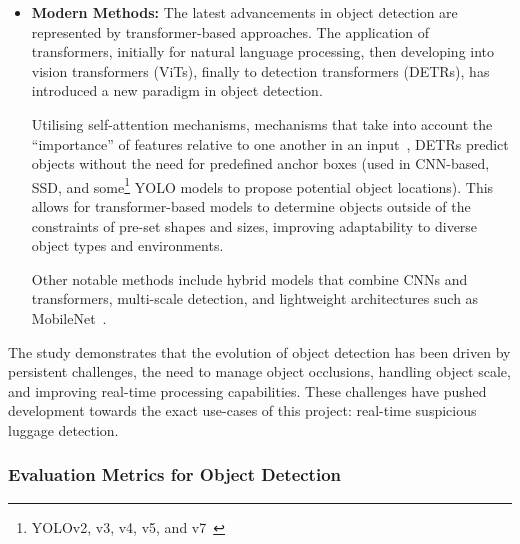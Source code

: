 \begin{itemize}
	      The shortcomings of two-stage detectors led to the development of single-stage
	      detectors. SSDs and YOLO (You Only Look Once)
	      \citep{jocher2023yolo8,pathak2023object} revolutionised the field by removing
	      the region proposal step, enabling predictions from an entire image in a single
	      propagation. This marked a breakthrough in real-time object detection, and is
	      used in nearly every example of abandoned luggage detection in literature
	      \citep{abandoned2025vrsalovic,dubey2024critical}.
	\item \textbf{Modern Methods:}
	      The latest advancements in object detection are represented by transformer-based
	      approaches. The application of transformers, initially for natural language
	      processing, then developing into vision transformers (ViTs), finally to detection
	      transformers (DETRs), has introduced a new paradigm in object detection.

	      Utilising self-attention mechanisms, mechanisms that take into account the
	      \enquote{importance} of features relative to one another in an
	      input~\citep{vaswani2023attentionneed}, DETRs predict objects without the need
	      for predefined anchor boxes (used in CNN-based, SSD, and some\footnote{YOLOv2,
		      v3, v4, v5, and v7~\citep{terven2023comprehensive}} YOLO models to propose
	      potential object locations). This allows for transformer-based models to
	      determine objects outside of the constraints of pre-set shapes and sizes,
	      improving adaptability to diverse object types and environments.

	      Other notable methods include hybrid models that combine CNNs and transformers,
	      multi-scale detection, and lightweight architectures such as
	      MobileNet~\citep{chiu2020mobilenet}.
\end{itemize}

The study demonstrates that the evolution of object detection has been driven
by persistent challenges, the need to manage object occlusions, handling object
scale, and improving real-time processing capabilities. These challenges have
pushed development towards the exact use-cases of this project: real-time
suspicious luggage detection.

\subsubsection{Evaluation Metrics for Object Detection}
\label{sec:evaluation_metrics_for_object_detection}

